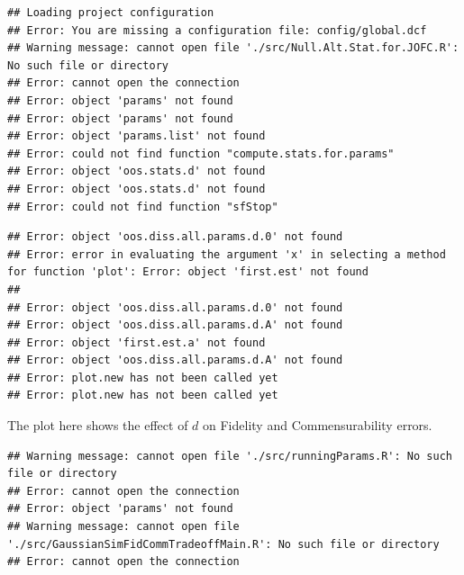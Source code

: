 \documentclass[11pt]{article} %
\begin{document}
\begin{knitrout}
\color{fgcolor}\begin{kframe}
\begin{verbatim}
## Loading project configuration
## Error: You are missing a configuration file: config/global.dcf
## Warning message: cannot open file './src/Null.Alt.Stat.for.JOFC.R': No such file or directory
## Error: cannot open the connection
## Error: object 'params' not found
## Error: object 'params' not found
## Error: object 'params.list' not found
## Error: could not find function "compute.stats.for.params"
## Error: object 'oos.stats.d' not found
## Error: object 'oos.stats.d' not found
## Error: could not find function "sfStop"
\end{verbatim}
\end{kframe}
\end{knitrout}


\begin{knitrout}
\color{fgcolor}\begin{kframe}
\begin{verbatim}
## Error: object 'oos.diss.all.params.d.0' not found
## Error: error in evaluating the argument 'x' in selecting a method for function 'plot': Error: object 'first.est' not found
## 
## Error: object 'oos.diss.all.params.d.0' not found
## Error: object 'oos.diss.all.params.d.A' not found
## Error: object 'first.est.a' not found
## Error: object 'oos.diss.all.params.d.A' not found
## Error: plot.new has not been called yet
## Error: plot.new has not been called yet
\end{verbatim}
\end{kframe}
\end{knitrout}

The plot here shows the effect of $d$ on Fidelity and Commensurability errors.

\begin{knitrout}
\color{fgcolor}\begin{kframe}
\begin{verbatim}
## Warning message: cannot open file './src/runningParams.R': No such file or directory
## Error: cannot open the connection
## Error: object 'params' not found
## Warning message: cannot open file './src/GaussianSimFidCommTradeoffMain.R': No such file or directory
## Error: cannot open the connection
\end{verbatim}
\end{kframe}
\end{knitrout}
\end{document}
